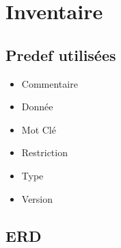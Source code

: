 \documentclass[a4paper,10pt]{article}
\begin{document}
\section{Inventaire}
\subsection{Predef utilisées}
\begin{itemize}
	\item Commentaire
	\item Donnée
	\item Mot Clé
	\item Restriction
	\item Type
	\item Version
\end{itemize}
\subsection{ERD}
\end{document}
